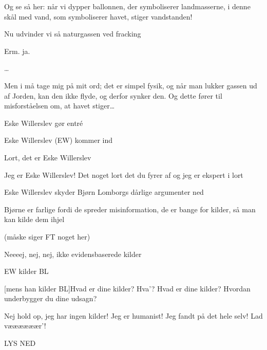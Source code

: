 \documentclass[a4paper,11pt]{article}
\begin{document}
\begin{sketch}

 Og se så her: når vi dypper ballonnen, der symboliserer landmasserne, i denne skål med vand, som symboliserer havet, stiger vandstanden! 

 Nu udvinder vi så naturgassen ved fracking


 Erm. ja. 

 \ldots 

 Men i må tage mig på mit ord; det er simpel fysik, og når man lukker gassen ud af Jorden, kan den ikke flyde, og derfor synker den. Og dette fører til misforståelsen om, at havet stiger\ldots

 Eske Willerslev gør entré

\scene Eske Willerslev (EW) kommer ind

Lort, det er Eske Willerslev

Jeg er Eske Willerslev! Det noget lort det du fyrer af og jeg er ekspert i lort

 Eske Willerslev skyder Bjørn Lomborgs dårlige argumenter ned

Bjørne er farlige fordi de spreder misinformation, de er bange for kilder, så man kan kilde dem ihjel

(måske siger FT noget her)

 Neeeej, nej, nej, ikke evidensbaserede kilder

\scene EW kilder BL

[mens han kilder BL]Hvad er dine kilder? Hva'? Hvad er dine kilder? Hvordan underbygger du dine udsagn?

 Nej hold op, jeg har ingen kilder! Jeg er humanist! Jeg fandt på det hele selv! Lad væææææær'!

LYS NED

\end{sketch}
\end{document}
